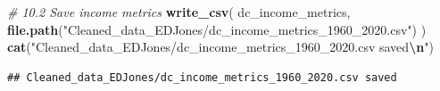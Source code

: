 \documentclass[
]{article}
\newenvironment{Shaded}{\begin{snugshade}}{\end{snugshade}}
\newcommand{\CommentTok}[1]{\textcolor[rgb]{0.56,0.35,0.01}{\textit{#1}}}
\newcommand{\FunctionTok}[1]{\textcolor[rgb]{0.13,0.29,0.53}{\textbf{#1}}}
\newcommand{\NormalTok}[1]{#1}
\newcommand{\SpecialCharTok}[1]{\textcolor[rgb]{0.81,0.36,0.00}{\textbf{#1}}}
\newcommand{\StringTok}[1]{\textcolor[rgb]{0.31,0.60,0.02}{#1}}
\begin{document}
\begin{Shaded}
\begin{Highlighting}[]
\CommentTok{\# 10.2 Save income metrics}
\FunctionTok{write\_csv}\NormalTok{(}
\NormalTok{  dc\_income\_metrics,}
  \FunctionTok{file.path}\NormalTok{(}\StringTok{"Cleaned\_data\_EDJones/dc\_income\_metrics\_1960\_2020.csv"}\NormalTok{)}
\NormalTok{) }
\FunctionTok{cat}\NormalTok{(}\StringTok{"Cleaned\_data\_EDJones/dc\_income\_metrics\_1960\_2020.csv saved}\SpecialCharTok{\textbackslash{}n}\StringTok{"}\NormalTok{)}
\end{Highlighting}
\end{Shaded}

\begin{verbatim}
## Cleaned_data_EDJones/dc_income_metrics_1960_2020.csv saved
\end{verbatim}
\end{document}
